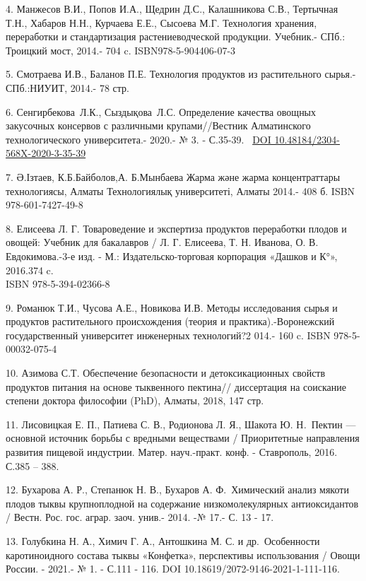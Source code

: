 4. Манжесов В.И., Попов И.А., Щедрин Д.С., Калашникова С.В., Тертычная
Т.Н., Хабаров Н.Н., Курчаева Е.Е., Сысоева М.Г. Технология хранения,
переработки и стандартизация растениеводческой продукции. Учебник.-
СПб.: Троицкий мост, 2014.- 704 c. ISBN978-5-904406-07-3

5. Смотраева И.В., Баланов П.Е. Технология продуктов из растительного
сырья.- СПб.:НИУИТ, 2014.- 78 стр.

6. Сенгирбекова~Л.К., Сыздықова~Л.С. Определение качества овощных
закусочных консервов с различными крупами//Вестник Алматинского
технологического университета.- 2020.- № 3. - С.35-39.~
\href{https://doi.org/10.48184/2304-568X-2020-3-35-39}{DOI
10.48184/2304-568X-2020-3-35-39}

7. Ә.Ізтаев, К.Б.Байболов,А. Б.Мынбаева Жарма және жарма концентраттары
технологиясы, Алматы Технологиялық университеті, Алматы 2014.- 408 б.
ISBN 978-601-7427-49-8

8. Елисеева Л. Г. Товароведение и экспертиза продуктов переработки
плодов и овощей: Учебник для бакалавров / Л. Г. Елисеева, Т. Н. Иванова,
О. В. Евдокимова.-3-е изд. - М.: Издательско-торговая корпорация «Дашков
и К°», 2016.374 c.\\
ISBN 978-5-394-02366-8

9. Романюк Т.И., Чусова А.Е., Новикова И.В. Методы исследования сырья и
продуктов растительного происхождения (теория и практика).-Воронежский
государственный университет инженерных технологий?2 014.- 160 c. ISBN
978-5-00032-075-4

10. Азимова С.Т. Обеспечение безопасности и детоксикационных свойств
продуктов питания на основе тыквенного пектина// диссертация на
соискание степени доктора философии (PhD), Алматы, 2018, 147 стр.

11. Лисовицкая Е. П., Патиева С. В., Родионова Л. Я., Шакота Ю.
Н\emph{.}~Пектин --- основной источник борьбы с вредными веществами /
Приоритетные направления развития пищевой индустрии. Матер. науч.-практ.
конф. - Ставрополь, 2016. С.385 -- 388.

12. Бухарова А. Р., Степанюк Н. В., Бухаров А. Ф.~Химический анализ
мякоти плодов тыквы крупноплодной на содержание низкомолекулярных
антиоксидантов / Вестн. Рос. гос. аграр. заоч. унив.- 2014. -№ 17.- С.
13 - 17.

13. Голубкина Н. А., Химич Г. А., Антошкина М. С. и др.~Особенности
каротиноидного состава тыквы «Конфетка», перспективы использования /
Овощи России. - 2021.- № 1. - С.111 - 116. DOI
10.18619/2072-9146-2021-1-111-116.

